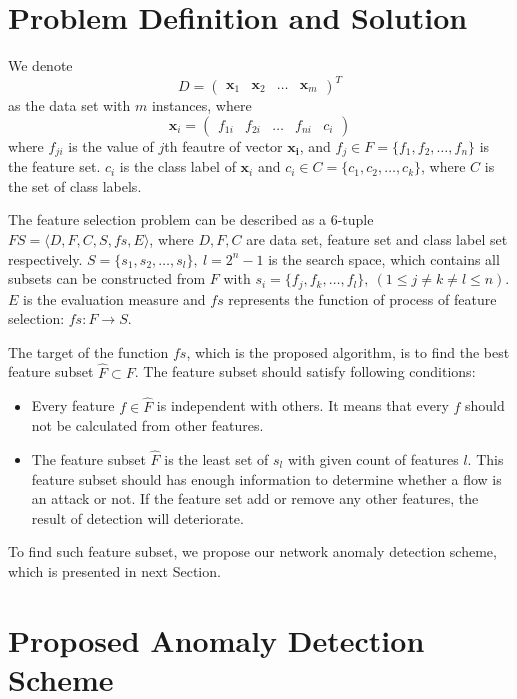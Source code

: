 \documentclass{ieeeaccess}
\theoremstyle{definition}
\begin{document}
\section{Problem Definition and Solution}
\label{sec:problem}

We denote
$$
    D=\left(
        \begin{array}{llll}
            \bm{x}_1 & \bm{x}_2 & \ldots & \bm{x}_m
        \end{array}
    \right)^T
$$
as the data set with $m$ instances, where
$$
    \bm{x}_i = \left(
        \begin{array}{lllll}
            f_{1i} & f_{2i} & \ldots & f_{ni} & c_i
        \end{array}
    \right)
$$
where $f_{ji}$ is the value of $j$th feautre of vector $\bm{x_i}$, and $f_j \in F = \{f_1, f_2, \ldots, f_n\}$ is the feature set. $c_i$ is the class label of $\bm{x}_i$ and $c_i \in C = \{c_1, c_2, \ldots, c_k\}$, where $C$ is the set of class labels.

The feature selection problem\cite{Maza2018} can be described as a 6-tuple $FS=\langle D, F, C, S, fs, E \rangle$, where $D, F, C$ are data set, feature set and class label set respectively. $S=\{s_1, s_2, \ldots, s_l\}, \ l=2^n-1$ is the search space, which contains all subsets can be constructed from $F$ with $s_i=\{f_j, f_k, \ldots, f_l\}, \ (1 \leqslant j \neq k \neq l \leqslant n)$. $E$ is the evaluation measure and $fs$ represents the function of process of feature selection: $fs: F \rightarrow S$.

The target of the function $fs$, which is the proposed algorithm, is to find the best feature subset $\hat{F} \subset F$. The feature subset should satisfy following conditions:
\begin{itemize}
    \item Every feature $f \in \hat{F}$ is independent with others. It means that every $f$ should not be calculated from other features.
    \item The feature subset $\hat{F}$ is the least set of $s_l$ with given count of features $l$. This feature subset should has enough information to determine whether a flow is an attack or not. If the feature set add or remove any other features, the result of detection will deteriorate.
\end{itemize}

To find such feature subset, we propose our network anomaly detection scheme, which is presented in next Section.

\section{Proposed Anomaly Detection Scheme}
\label{sec:methods}
\end{document}
